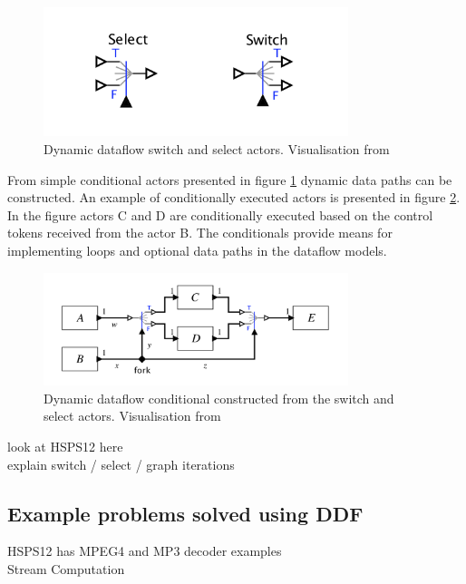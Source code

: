 \documentclass[conference,a4paper]{IEEEtran}
\begin{document}
\begin{figure}[!t]
    \centering
        \includegraphics[width=21pc]{ddf_actors.png}
        \caption{Dynamic dataflow switch and select actors. Visualisation from
        \cite{lee2015introduction}}
        \label{fig:actors1}
\end{figure}

From simple conditional actors presented in figure \ref{fig:actors1} dynamic
data paths can be constructed. An example of conditionally executed actors is
presented in figure \ref{fig:conditional}. In the figure actors C and D are
conditionally executed based on the control tokens received from the actor B.
The conditionals provide means for implementing loops and optional data paths in
the dataflow models.

\begin{figure}[!t]
    \centering
        \includegraphics[width=21pc]{ddf_conditional.png}
        \caption{Dynamic dataflow conditional constructed from the switch and
        select actors. Visualisation from \cite{lee2015introduction}}
        \label{fig:conditional}
\end{figure}

look at HSPS12 here \\
explain switch / select / graph iterations \\

\subsection{Example problems solved using DDF}
HSPS12 has MPEG4 and MP3 decoder examples \\
Stream Computation \\
\end{document}
